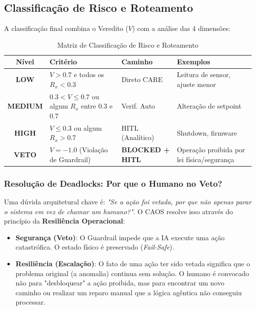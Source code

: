 \documentclass[12pt, a4paper]{article}
\begin{document}
\subsection{Classificação de Risco e Roteamento}

A classificação final combina o Veredito ($V$) com a análise das 4 dimensões:

\begin{table}[h!]
\centering
\small
\begin{tabularx}{\textwidth}{|c|>{\raggedright\arraybackslash}X|l|>{\raggedright\arraybackslash}X|}
\hline
\textbf{Nível} & \textbf{Critério} & \textbf{Caminho} & \textbf{Exemplos} \\ \hline\hline
\cellcolor{green!20}\textbf{LOW} & $V > 0.7$ e todos os $R_x < 0.3$ & Direto CARE & Leitura de sensor, ajuste menor \\ \hline
\cellcolor{yellow!20}\textbf{MEDIUM} & $0.3 < V \leq 0.7$ ou algum $R_x$ entre 0.3 e 0.7 & Verif. Auto & Alteração de setpoint \\ \hline
\cellcolor{orange!20}\textbf{HIGH} & $V \leq 0.3$ ou algum $R_x > 0.7$ & HITL (Analítico) & Shutdown, firmware \\ \hline
\cellcolor{red!20}\textbf{VETO} & $V = -1.0$ (Violação de Guardrail) & \textbf{BLOCKED + HITL} & Operação proibida por lei física/segurança \\ \hline
\end{tabularx}
\caption{Matriz de Classificação de Risco e Roteamento}
\label{tab:risk_classification}
\end{table}

\subsubsection{Resolução de Deadlocks: Por que o Humano no Veto?}

Uma dúvida arquitetural chave é: \textit{"Se a ação foi vetada, por que não apenas parar o sistema em vez de chamar um humano?"}. O CAOS resolve isso através do princípio da \textbf{Resiliência Operacional}:

\begin{itemize}
    \item \textbf{Segurança (Veto)}: O Guardrail impede que a IA execute uma ação catastrófica. O estado físico é preservado (\textit{Fail-Safe}).
    \item \textbf{Resiliência (Escalação)}: O fato de uma ação ter sido vetada significa que o problema original (a anomalia) continua sem solução. O humano é convocado não para "desbloquear" a ação proibida, mas para encontrar um novo caminho ou realizar um reparo manual que a lógica agêntica não conseguiu processar.
\end{itemize}
\end{document}
